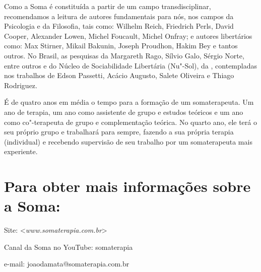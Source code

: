Como a Soma é constituída a partir de um campo transdisciplinar,
recomendamos a leitura de autores fundamentais para nós, nos campos da
Psicologia e da Filosofia, tais como: Wilhelm Reich, Friedrich Perls,
David Cooper, Alexander Lowen, Michel Foucault, Michel Onfray; e autores
libertários como: Max Stirner, Mikail Bakunin, Joseph Proudhon, Hakim
Bey e tantos outros. No Brasil, as pesquisas da Margareth Rago, Sílvio
Galo, Sérgio Norte, entre outros e do Núcleo de Sociabilidade Libertária
(Nu"-Sol), da , contempladas nos trabalhos de Edson Passetti,
Acácio Augusto, Salete Oliveira e Thiago Rodriguez.

É de quatro anos em média o tempo para a formação de um somaterapeuta.
Um ano de terapia, um ano como assistente de grupo e estudos teóricos e
um ano como co"-terapeuta de grupo e complementação teórica. No quarto
ano, ele terá o seu próprio grupo e trabalhará para sempre, fazendo a
sua própria terapia (individual) e recebendo supervisão de seu trabalho
por um somaterapeuta mais experiente.

\section*{Para obter mais informações sobre a Soma:}

Site:
\textless{}\emph{www.somaterapia.com.br}\textgreater{}

Canal da Soma no YouTube: somaterapia

e-mail: joaodamata@somaterapia.com.br